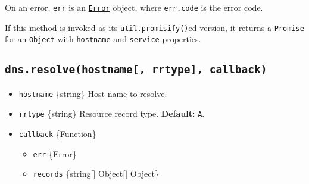 On an error, \texttt{err} is an
\href{errors.md\#class-error}{\texttt{Error}} object, where
\texttt{err.code} is the error code.

\begin{Shaded}
\begin{Highlighting}[]
\OperatorTok{=} \NormalTok{(}\NormalTok{)}\OperatorTok{;}
\NormalTok{(}\OperatorTok{,} \OperatorTok{,}\OperatorTok{,}\OperatorTok{,}\KeywordTok{=\textgreater{}}\NormalTok{ \{}
  \OperatorTok{,}\OperatorTok{;}
\NormalTok{\})}\OperatorTok{;}
\end{Highlighting}
\end{Shaded}

If this method is invoked as its
\href{util.md\#utilpromisifyoriginal}{\texttt{util.promisify()}}ed
version, it returns a \texttt{Promise} for an \texttt{Object} with
\texttt{hostname} and \texttt{service} properties.

\subsection{\texorpdfstring{\texttt{dns.resolve(hostname{[},\ rrtype{]},\ callback)}}{dns.resolve(hostname{[}, rrtype{]}, callback)}}\label{dns.resolvehostname-rrtype-callback}

\begin{itemize}
\tightlist
\item
  \texttt{hostname} \{string\} Host name to resolve.
\item
  \texttt{rrtype} \{string\} Resource record type. \textbf{Default:}
  \texttt{\textquotesingle{}A\textquotesingle{}}.
\item
  \texttt{callback} \{Function\}

  \begin{itemize}
  \tightlist
  \item
    \texttt{err} \{Error\}
  \item
    \texttt{records} \{string{[}{]} \textbar{} Object{[}{]} \textbar{}
    Object\}
  \end{itemize}
\end{itemize}

